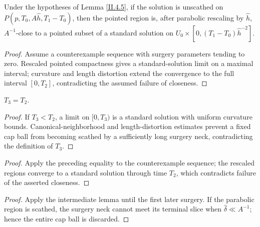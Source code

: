 \begin{lemma}
  \label{lem:kl-evolution-surgery-cap-existence-standard-solutions-2}
 \label{intermediate}
Under the hypotheses of Lemma \ref{II.4.5}, if the solution is unscathed on
$P(p,T_0,A\hat h,T_1-T_0)$, then the pointed region is, after parabolic
rescaling by $\hat h$, $A^{-1}$-close to a pointed subset of a standard
solution on $U_0\times[0,(T_1-T_0)\hat h^{-2}]$.
\end{lemma}
\begin{proof}
\sketch Assume a counterexample sequence with surgery parameters tending to
zero. Rescaled pointed compactness gives a standard-solution limit on a
maximal interval; curvature and length distortion extend the convergence to
the full interval $[0,T_2]$, contradicting the assumed failure of closeness.
\end{proof}

\begin{lemma}
  \label{lem:kl-evolution-surgery-cap-ricci-flow-surgery-lemma}
$T_3=T_2$.
\end{lemma}
\begin{proof}
\sketch If $T_3<T_2$, a limit on $[0,T_3)$ is a standard solution with
uniform curvature bounds. Canonical-neighborhood and length-distortion
estimates prevent a fixed cap ball from becoming scathed by a sufficiently
long surgery neck, contradicting the definition of $T_3$.
\end{proof}
\begin{proof}
\sketch Apply the preceding equality to the counterexample sequence; the
rescaled regions converge to a standard solution through time $T_2$, which
contradicts failure of the asserted closeness.
\end{proof}
\begin{proof}
\sketch Apply the intermediate lemma until the first later surgery. If the
parabolic region is scathed, the surgery neck cannot meet its terminal slice
when $\hat\delta\ll A^{-1}$; hence the entire cap ball is discarded.
\end{proof}

